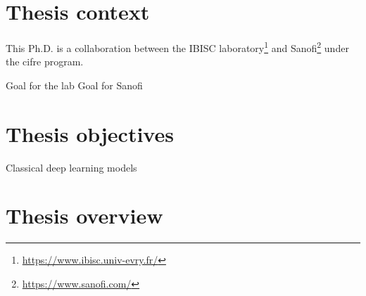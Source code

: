 \documentclass[../main.tex]{subfiles}
\begin{document}
\section{Thesis context}
 This Ph.D. is a collaboration between the IBISC laboratory\footnote{\url{https://www.ibisc.univ-evry.fr/}} and Sanofi\footnote{\url{https://www.sanofi.com/}} under the \gls{cifre} program.

 Goal for the lab
 Goal for Sanofi

\section{Thesis objectives}
 \begin{description}[
		 style=multiline,
		 leftmargin=!,
		 labelwidth=\eqboxwidth{listlabel@\EnumitemId}, format=\mylabelformat
	 ]
	 \item[First objective] Classical deep learning models
	 \item[Second objective]
	 \item[Third objective]
 \end{description}



 \clearpage
\section{Thesis overview}
 \begin{center}
	 \ifSubfilesClassLoaded{%
	 }{
	 }
 \end{center}

\end{document}
